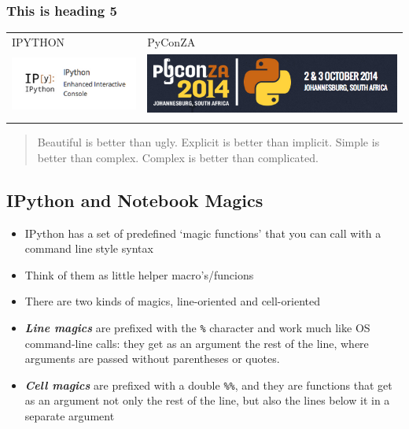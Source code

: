 \documentclass{article}
\begin{document}
\subsubsection{This is heading 5}

\begin{longtable}[c]{@{}ll@{}}
\hline\noalign{\medskip}
IPYTHON & PyConZA
\\\noalign{\medskip}
\hline\noalign{\medskip}
\includegraphics{static/img/ipy.png} &
\includegraphics{static/img/pyconza.png}
\\\noalign{\medskip}
\hline
\end{longtable}

\begin{quote}
Beautiful is better than ugly. Explicit is better than implicit. Simple
is better than complex. Complex is better than complicated.
\end{quote}

    \subsection{IPython and Notebook Magics}

\begin{itemize}
\itemsep1pt\parskip0pt
\item
  IPython has a set of predefined `magic functions' that you can call
  with a command line style syntax
\item
  Think of them as little helper macro's/funcions
\item
  There are two kinds of magics, line-oriented and cell-oriented
\item
  \textbf{\emph{Line magics}} are prefixed with the \texttt{\%}
  character and work much like OS command-line calls: they get as an
  argument the rest of the line, where arguments are passed without
  parentheses or quotes.
\item
  \textbf{\emph{Cell magics}} are prefixed with a double \texttt{\%\%},
  and they are functions that get as an argument not only the rest of
  the line, but also the lines below it in a separate argument
\end{itemize}
\end{document}
